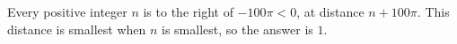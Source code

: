 Every positive integer $n$ is to the right of $-100\pi<0$, at distance $n+100\pi$. This distance is smallest when $n$ is smallest, so the answer is $\boxed{1}$.
